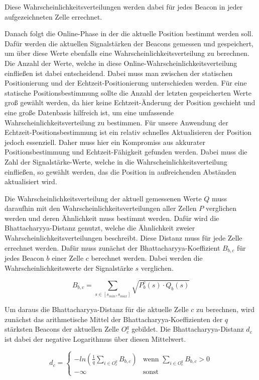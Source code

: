 Diese Wahrscheinlichkeitsverteilungen werden dabei für jedes Beacon in jeder aufgezeichneten Zelle errechnet.

Danach folgt die Online-Phase in der die aktuelle Position bestimmt werden soll. Dafür werden die aktuellen Signalstärken der Beacons gemessen und gespeichert, um über diese Werte ebenfalls eine Wahrscheinlichkeitsverteilung zu berechnen. Die Anzahl der Werte, welche in diese Online-Wahrscheinlichkeitsverteilung einfließen ist dabei entscheidend.
Dabei muss man zwischen der statischen Positionierung und der Echtzeit-Positionierung unterschieden werden.
Für eine statische Positionsbestimmung sollte die Anzahl der letzten gespeicherten Werte groß gewählt werden, da hier keine Echtzeit-Änderung der Position geschieht und eine große Datenbasis hilfreich ist, um eine umfassende Wahrscheinlichkeitsverteilung zu bestimmen.
Für unsere Anwendung der Echtzeit-Positionsbestimmung ist ein relativ schnelles Aktualisieren der Position jedoch essenziell. Daher muss hier ein Kompromiss aus akkurater Positionsbestimmung und Echtzeit-Fähigkeit gefunden werden. Dabei muss die Zahl der Signalstärke-Werte, welche in die Wahrscheinlichkeitsverteilung einfließen, so gewählt werden, das die Position in außreichenden Abständen aktualisiert wird.

Die Wahrscheinlichkeitsverteilung der aktuell gemessenen Werte $Q$ muss daraufhin mit den Wahrscheinlichkeitsverteilungen aller Zellen $P$ verglichen werden und deren Ähnlichkeit muss bestimmt werden. Dafür wird die Bhattacharyya-Distanz genutzt, welche die Ähnlichkeit zweier Wahrscheinlichkeitsverteilungen beschreibt. 
Diese Distanz muss für jede Zelle errechnet werden. 
Dafür muss zunächst der Bhattacharyya-Koeffizient $B_{b, c}$ für jedes Beacon $b$ einer Zelle $c$ berechnet werden. Dabei werden die Wahrscheinlichkeitswerte der Signalstärke $s$ verglichen.

\begin{equation}
	B_{b, c} = \sum_{s \in [s_{min},s_{max}]} \sqrt{P_{b}^{c}(s) \cdot Q_{b}(s)}
\end{equation}

Um daraus die Bhattacharyya-Distanz für die aktuelle Zelle $c$ zu berechnen, wird zunächst das arithmetische Mittel der Bhattacharyya-Koeffizienten der $q$ stärksten Beacons der aktuellen Zelle $O_{c}^{q}$ gebildet. Die Bhattacharyya-Distanz $d_{c}$ ist dabei der negative Logarithmus über diesen Mittelwert.

\begin{equation}
	d_{c}= \begin{cases}
	-ln (\frac{1}{q} \sum_{i \in O_{c}^{q}} B_{b, c}) & \text{wenn } \sum_{i \in O_{c}^{q}} B_{b, c} > 0 \\
	- \infty & \text{sonst}
	\end{cases}
\end{equation}

